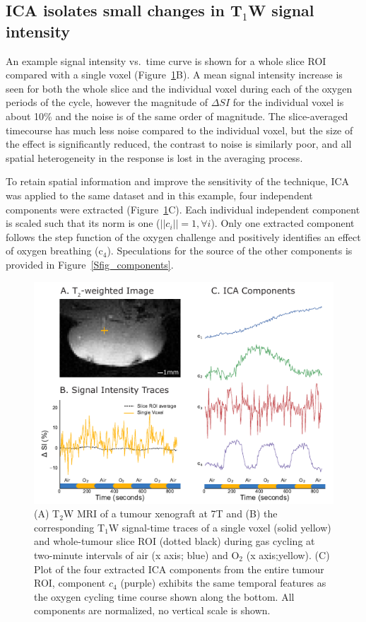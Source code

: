 \subsection{\texorpdfstring{\acs{ICA}}{ICA} isolates small changes in \texorpdfstring{T$_1$}{T1}W signal intensity}
\label{res1}

An example signal intensity vs.\ time curve is shown for a whole slice ROI compared with a single voxel (Figure~\ref{technique}B).
A mean signal intensity increase is seen for both the whole slice and the individual voxel during each of the oxygen periods of the cycle, however the magnitude of $\Delta SI$ for the individual voxel is about 10\% and the noise is of the same order of magnitude.
The slice-averaged timecourse has much less noise compared to the individual voxel, but the size of the effect is significantly reduced, the contrast to noise is similarly poor, and all spatial heterogeneity in the response is lost in the averaging process.

To retain spatial information and improve the sensitivity of the technique, \acs{ICA} was applied to the same dataset and in this example, four independent components were extracted (Figure~\ref{technique}C). 
Each individual independent component is scaled such that its norm is one ($||c_i||=1, \forall i $).
Only one extracted component follows the step function of the oxygen challenge and positively identifies an effect of oxygen breathing (c$_4$).
Speculations for the source of the other components is provided in Figure~\ref{Sfig_components}.
\begin{figure}[htbp]
   \includegraphics[width=\textwidth]{oemri_thesis1/oemri_thesis1-images/fig1_technique.pdf} %
   \caption{(A) T$_2$W MRI of a tumour xenograft at 7T and (B) the corresponding T$_1$W signal-time traces of a single voxel (solid yellow) and whole-tumour slice ROI (dotted black) during gas cycling at two-minute intervals of air (x axis; blue) and O$_2$ (x axis;yellow).
(C) Plot of the four extracted \acs{ICA} components from the entire tumour ROI, component \textbf{$c_4$} (purple) exhibits the same temporal features as the oxygen cycling time course shown along the bottom. All components are normalized, no vertical scale is shown.}
   \label{technique}
\end{figure}

